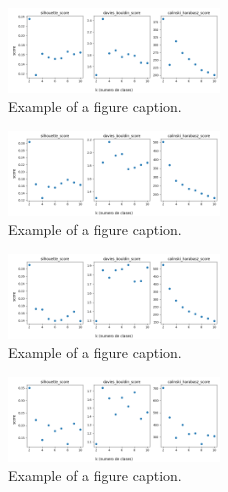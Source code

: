 \begin{figure}[htbp]
\centerline{\includegraphics[width=0.5\textwidth]{graficos_experimentos/gmm/caracteristicos2_pca0.9.png}}
\caption{Example of a figure caption.}
\label{graficos_experimentos/gmm/caracteristicos2_pca0.9.png}
\end{figure}
 
\begin{figure}[htbp]
\centerline{\includegraphics[width=0.5\textwidth]{graficos_experimentos/gmm/caracteristicos2_pca0.95.png}}
\caption{Example of a figure caption.}
\label{graficos_experimentos/gmm/caracteristicos2_pca0.95.png}
\end{figure}
 
\begin{figure}[htbp]
\centerline{\includegraphics[width=0.5\textwidth]{graficos_experimentos/gmm/caracteristicos2_pca0.99.png}}
\caption{Example of a figure caption.}
\label{graficos_experimentos/gmm/caracteristicos2_pca0.99.png}
\end{figure}
 
\begin{figure}[htbp]
\centerline{\includegraphics[width=0.5\textwidth]{graficos_experimentos/gmm/caracteristicos3_pca0.9.png}}
\caption{Example of a figure caption.}
\label{graficos_experimentos/gmm/caracteristicos3_pca0.9.png}
\end{figure}
 
